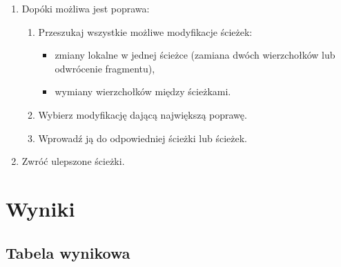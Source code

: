 \documentclass[11pt]{article}
\begin{document}
\begin{enumerate}
  \item Dopóki możliwa jest poprawa:
  \begin{enumerate}
    \item Przeszukaj wszystkie możliwe modyfikacje ścieżek:
    \begin{itemize}
      \item zmiany lokalne w jednej ścieżce (zamiana dwóch wierzchołków lub odwrócenie fragmentu),
      \item wymiany wierzchołków między ścieżkami.
    \end{itemize}
    \item Wybierz modyfikację dającą największą poprawę.
    \item Wprowadź ją do odpowiedniej ścieżki lub ścieżek.
  \end{enumerate}
  \item Zwróć ulepszone ścieżki.
\end{enumerate}


\section{Wyniki}\label{sec:wyniki}

\subsection{Tabela wynikowa}\label{subsec:tabela-wynikowa}

\begin{table}[ht]
\centering
{}
\caption{Wyniki dla \texttt{kroA200} z algorytmem \texttt{randomstart}}
\end{table}
\end{document}
